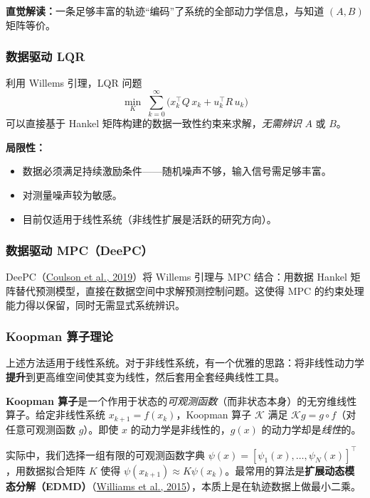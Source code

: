 \textbf{直觉解读：}一条足够丰富的轨迹``编码''了系统的全部动力学信息，与知道 $(A, B)$ 矩阵等价。

\subsubsection{数据驱动 LQR}

利用 Willems 引理，LQR 问题
\[
\min_{K}\; \sum_{k=0}^{\infty} \bigl(x_k^\top Q\, x_k + u_k^\top R\, u_k\bigr)
\]
可以直接基于 Hankel 矩阵构建的数据一致性约束来求解，\emph{无需辨识} $A$ 或 $B$。

\textbf{局限性：}
\begin{itemize}[nosep]
    \item 数据必须满足持续激励条件------随机噪声不够，输入信号需足够丰富。
    \item 对测量噪声较为敏感。
    \item 目前仅适用于线性系统（非线性扩展是活跃的研究方向）。
\end{itemize}

\subsubsection{数据驱动 MPC（DeePC）}

DeePC（\href{https://arxiv.org/abs/1811.05890}{Coulson et al., 2019}）将 Willems 引理与 MPC 结合：用数据 Hankel 矩阵替代预测模型，直接在数据空间中求解预测控制问题。这使得 MPC 的约束处理能力得以保留，同时无需显式系统辨识。

\subsubsection{Koopman 算子理论}

上述方法适用于线性系统。对于非线性系统，有一个优雅的思路：将非线性动力学\textbf{提升}到更高维空间使其变为线性，然后套用全套经典线性工具。

\textbf{Koopman 算子}是一个作用于状态的\emph{可观测函数}（而非状态本身）的无穷维线性算子。给定非线性系统 $x_{k+1} = f(x_k)$，Koopman 算子 $\mathcal{K}$ 满足 $\mathcal{K} g = g \circ f$（对任意可观测函数 $g$）。即使 $x$ 的动力学是非线性的，$g(x)$ 的动力学却是\emph{线性}的。

实际中，我们选择一组有限的可观测函数字典 $\psi(x) = [\psi_1(x), \ldots, \psi_N(x)]^\top$，用数据拟合矩阵 $K$ 使得 $\psi(x_{k+1}) \approx K \psi(x_k)$。最常用的算法是\textbf{扩展动态模态分解（EDMD）}（\href{https://arxiv.org/abs/1408.4408}{Williams et al., 2015}），本质上是在轨迹数据上做最小二乘。

